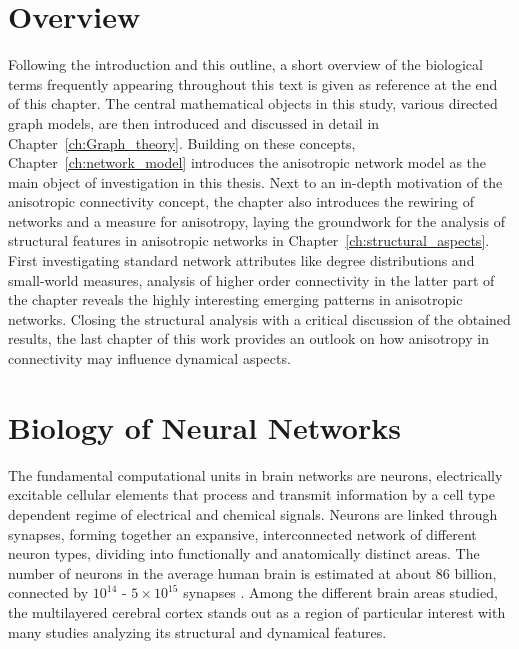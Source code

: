 
\section{Overview}\label{sec:all_overview}

Following the introduction and this outline, a short overview of the
biological terms frequently appearing throughout this text is given as
reference at the end of this chapter. The central mathematical objects
in this study, various directed graph models, are then introduced and
discussed in detail in Chapter~\ref{ch:Graph_theory}. Building on
these concepts, Chapter~\ref{ch:network_model} introduces the
anisotropic network model as the main object of investigation in this
thesis. Next to an in-depth motivation of the anisotropic connectivity
concept, the chapter also introduces the rewiring of networks and a
measure for anisotropy, laying the groundwork for the analysis of
structural features in anisotropic networks in
Chapter~\ref{ch:structural_aspects}. First investigating standard
network attributes like degree distributions and small-world measures,
analysis of higher order connectivity in the latter part of the
chapter reveals the highly interesting emerging patterns in
anisotropic networks. Closing the structural analysis with a critical
discussion of the obtained results, the last chapter of this work
provides an outlook on how anisotropy in connectivity may influence
dynamical aspects.



\section{Biology of Neural Networks}\label{sec:Biology} 



The fundamental computational units in brain networks are
neurons, electrically excitable cellular elements that
process and transmit information by a cell type dependent regime of
electrical and chemical signals. Neurons are linked through
synapses, forming together an expansive, interconnected
network of different neuron types, dividing into functionally and
anatomically distinct areas. The number of neurons in the average
human brain is estimated at about 86 billion, connected by
$10^{14}$ - $5\times10^{15}$ synapses \parencite{Herculano2009,
  Drachman2005}. Among the different brain areas studied, the
multilayered cerebral cortex stands out as a region of
particular interest with many studies analyzing its structural and
dynamical features.


